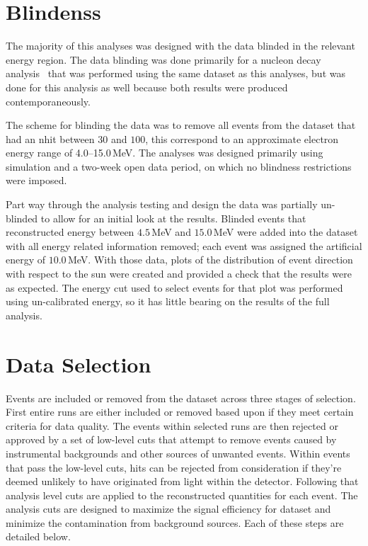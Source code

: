 \section{Blindenss}
The majority of this analyses was designed with the data blinded in the
relevant energy region.
The data blinding was done primarily for a nucleon decay analysis~\citep{ND_PAPER}
that was performed using the same dataset as this analyses, but was done
for this analysis as well because both results were produced contemporaneously.

The scheme for blinding the data was to remove all events from the dataset that
had an nhit between $30$ and $100$, this correspond to an approximate electron energy
range of \numrange{4.0}{15.0}\,MeV.
The analyses was designed primarily using simulation and a two-week open
data period, on which no blindness restrictions were imposed.

Part way through the analysis testing and design the data was partially un-blinded
to allow for an initial look at the results.
Blinded events that reconstructed energy between $4.5$\,MeV and $15.0$\,MeV
were added into the dataset with all energy related information removed;
each event was assigned the artificial energy of $10.0$\,MeV.
With those data, plots of the distribution of event direction with respect to
the sun were created and provided a check that the results were as expected.
The energy cut used to select events for that plot was performed using
un-calibrated energy, so it has little bearing on the results of the full
analysis.

\section{Data Selection}
\label{sec:data_selection}
Events are included or removed from the dataset across three stages of selection.
First entire runs are either included or removed based upon if they meet
certain criteria for data quality.
The events within selected runs are then rejected or approved by a set
of low-level cuts that attempt to remove events caused by instrumental
backgrounds and other sources of unwanted events.
Within events that pass the low-level cuts, hits can be rejected from consideration
if they're deemed unlikely to have originated from light within the detector.
Following that analysis level cuts are applied to the reconstructed quantities
for each event.
The analysis cuts are designed to maximize the signal efficiency for dataset and minimize the
contamination from background sources.
Each of these steps are detailed below.

